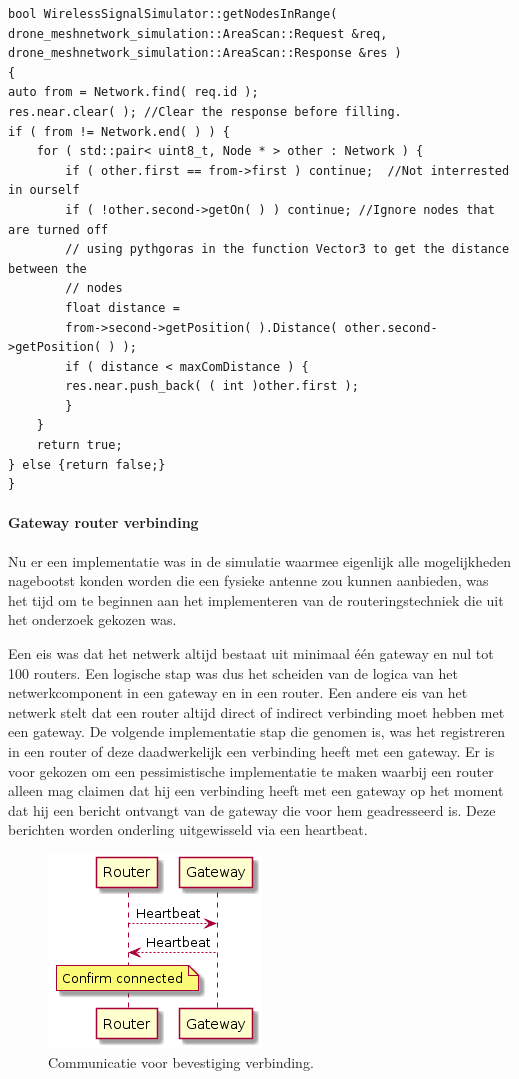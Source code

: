 \documentclass[a4paper, 11pt, oneside]{report}
\begin{document}
\begin{lstlisting}
bool WirelessSignalSimulator::getNodesInRange(
drone_meshnetwork_simulation::AreaScan::Request &req,
drone_meshnetwork_simulation::AreaScan::Response &res )
{   
auto from = Network.find( req.id );
res.near.clear( ); //Clear the response before filling.
if ( from != Network.end( ) ) {
	for ( std::pair< uint8_t, Node * > other : Network ) {
		if ( other.first == from->first ) continue;  //Not interrested in ourself
		if ( !other.second->getOn( ) ) continue; //Ignore nodes that are turned off
		// using pythgoras in the function Vector3 to get the distance between the
		// nodes
		float distance =
		from->second->getPosition( ).Distance( other.second->getPosition( ) );
		if ( distance < maxComDistance ) {
		res.near.push_back( ( int )other.first );
		}
	}	
	return true;
} else {return false;}
}
\end{lstlisting} 
 
\paragraph{Gateway router verbinding}
Nu er een implementatie was in de simulatie waarmee eigenlijk alle mogelijkheden nagebootst konden worden die een fysieke antenne zou kunnen aanbieden, was het tijd om te beginnen aan het implementeren van de routeringstechniek die uit het onderzoek gekozen was.

Een eis was dat het netwerk altijd bestaat uit minimaal één gateway en nul tot 100 routers.
Een logische stap was dus het scheiden van de logica van het netwerkcomponent in een gateway en in een router.
Een andere eis van het netwerk stelt dat een router altijd direct of indirect verbinding moet hebben met een gateway.
De volgende implementatie stap die genomen is, was het registreren in een router of deze daadwerkelijk een verbinding heeft met een gateway.
Er is voor gekozen om een pessimistische implementatie te maken waarbij een router alleen mag claimen dat hij een verbinding heeft met een gateway op het moment dat hij een bericht ontvangt van de gateway die voor hem geadresseerd is.
Deze berichten worden onderling uitgewisseld via een heartbeat. 

\begin{figure}[H]
	\begin{center}\includegraphics[width=0.2\linewidth]{Afbeeldingen/heartbeat.png}\end{center}
	\caption{Communicatie voor bevestiging verbinding.}
	\label{fig:bevestigingverbinding}
\end{figure}
\end{document}
